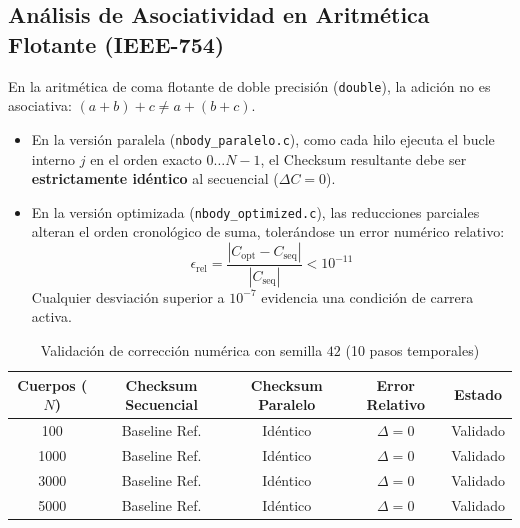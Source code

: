 \documentclass[11pt,a4paper]{article}
\begin{document}
\subsection{Análisis de Asociatividad en Aritmética Flotante (IEEE-754)}
En la aritmética de coma flotante de doble precisión (\texttt{double}), la adición no es asociativa: $(a + b) + c \neq a + (b + c)$.
\begin{itemize}
    \item En la versión paralela (\texttt{nbody\_paralelo.c}), como cada hilo ejecuta el bucle interno $j$ en el orden exacto $0 \dots N-1$, el Checksum resultante debe ser \textbf{estrictamente idéntico} al secuencial ($\Delta C = 0$).
    \item En la versión optimizada (\texttt{nbody\_optimized.c}), las reducciones parciales alteran el orden cronológico de suma, tolerándose un error numérico relativo:
    \begin{equation}
        \epsilon_{\text{rel}} = \frac{|C_{\text{opt}} - C_{\text{seq}}|}{|C_{\text{seq}}|} < 10^{-11}
    \end{equation}
    Cualquier desviación superior a $10^{-7}$ evidencia una condición de carrera activa.
\end{itemize}

\begin{table}[h!]
\centering
\caption{Validación de corrección numérica con semilla $42$ (10 pasos temporales)}
\label{tab:correccion}
\begin{tabular}{@{}ccccc@{}}
\toprule
\textbf{Cuerpos ($N$)} & \textbf{Checksum Secuencial} & \textbf{Checksum Paralelo} & \textbf{Error Relativo} & \textbf{Estado} \\ \midrule
100 & Baseline Ref. & Idéntico & $\Delta = 0$ & Validado \\
1000 & Baseline Ref. & Idéntico & $\Delta = 0$ & Validado \\
3000 & Baseline Ref. & Idéntico & $\Delta = 0$ & Validado \\
5000 & Baseline Ref. & Idéntico & $\Delta = 0$ & Validado \\ \bottomrule
\end{tabular}
\end{table}

\end{document}
